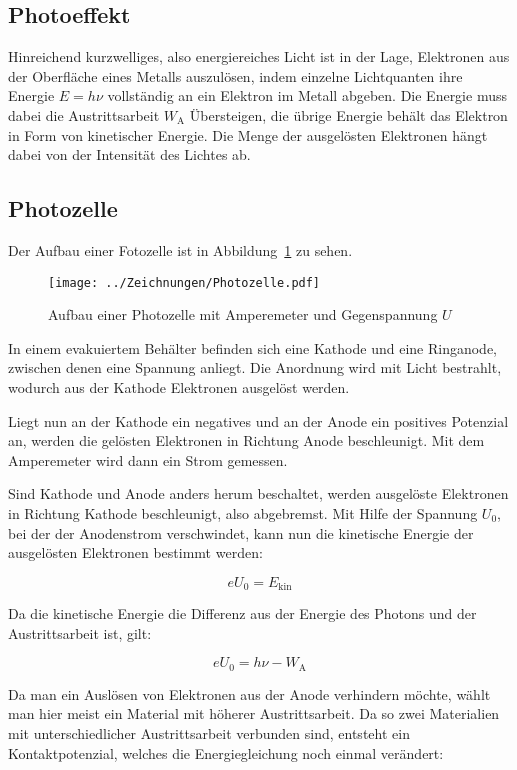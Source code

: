 \subsection{Photoeffekt}

Hinreichend kurzwelliges, also energiereiches Licht ist in der Lage, Elektronen
aus der Oberfläche eines Metalls auszulösen, indem einzelne Lichtquanten ihre
Energie $E = h\nu$ vollständig an ein Elektron im Metall abgeben. Die Energie
muss dabei die Austrittsarbeit $W_\text{A}$ Übersteigen, die übrige Energie
behält das Elektron in Form von kinetischer Energie. Die Menge der ausgelösten
Elektronen hängt dabei von der Intensität des Lichtes ab.

\subsection{Photozelle}

Der Aufbau einer Fotozelle ist in Abbildung~\ref{fig:Photozelle} zu sehen.

\begin{figure}
    \centering
    \texttt{[image: ../Zeichnungen/Photozelle.pdf]}
    \caption{%
        Aufbau einer Photozelle mit Amperemeter und Gegenspannung $U$
    }
    \label{fig:Photozelle}
\end{figure}

In einem evakuiertem Behälter befinden sich eine Kathode und eine Ringanode,
zwischen denen eine Spannung anliegt. Die Anordnung wird mit Licht bestrahlt,
wodurch aus der Kathode Elektronen ausgelöst werden.

Liegt nun an der Kathode ein negatives und an der Anode ein positives Potenzial
an, werden die gelösten Elektronen in Richtung Anode beschleunigt. Mit dem
Amperemeter wird dann ein Strom gemessen.

Sind Kathode und Anode anders herum beschaltet, werden ausgelöste Elektronen in
Richtung Kathode beschleunigt, also abgebremst. Mit Hilfe der Spannung $U_0$,
bei der der Anodenstrom verschwindet, kann nun die kinetische Energie der
ausgelösten Elektronen bestimmt werden:

\[eU_0 = E_\text{kin}\]

Da die kinetische Energie die Differenz aus der Energie des Photons und der
Austrittsarbeit ist, gilt:

\[eU_0 = h\nu-W_\text{A}\]

Da man ein Auslösen von Elektronen aus der Anode verhindern möchte, wählt man
hier meist ein Material mit höherer Austrittsarbeit. Da so zwei Materialien mit
unterschiedlicher Austrittsarbeit verbunden sind, entsteht ein
Kontaktpotenzial, welches die Energiegleichung noch einmal verändert:

